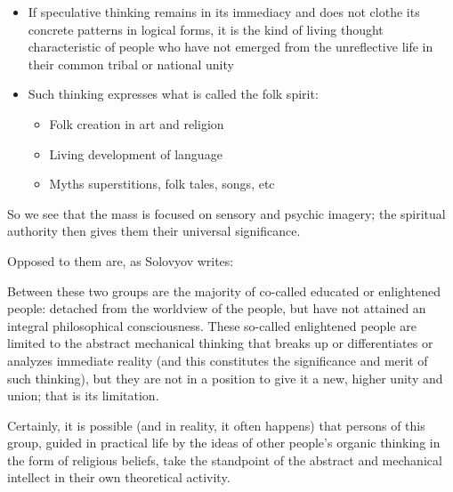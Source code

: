 \begin{itemize}
\item \begin{quotex}
If speculative thinking remains in its immediacy and does not clothe its concrete patterns in logical forms, it is the kind of living thought characteristic of people who have not emerged from the unreflective life in their common tribal or national unity 
\end{quotex}
\item \begin{quotex}
Such thinking expresses what is called the folk spirit: 

\end{quotex}
\begin{itemize}
\item \begin{quotex}
Folk creation in art and religion 
\end{quotex}
\item \begin{quotex}
Living development of language 
\end{quotex}
\item \begin{quotex}
Myths superstitions, folk tales, songs, etc 
\end{quotex}
\end{itemize}
\end{itemize}
So we see that the mass is focused on sensory and psychic imagery; the spiritual authority then gives them their universal significance.

Opposed to them are, as Solovyov writes:

\begin{quotex}
Between these two groups are the majority of co-called educated or enlightened people: detached from the worldview of the people, but have not attained an integral philosophical consciousness. These so-called enlightened people are limited to the abstract mechanical thinking that breaks up or differentiates or analyzes immediate reality (and this constitutes the significance and merit of such thinking), but they are not in a position to give it a new, higher unity and union; that is its limitation.

Certainly, it is possible (and in reality, it often happens) that persons of this group, guided in practical life by the ideas of other people's organic thinking in the form of religious beliefs, take the standpoint of the abstract and mechanical intellect in their own theoretical activity. 

\end{quotex}
